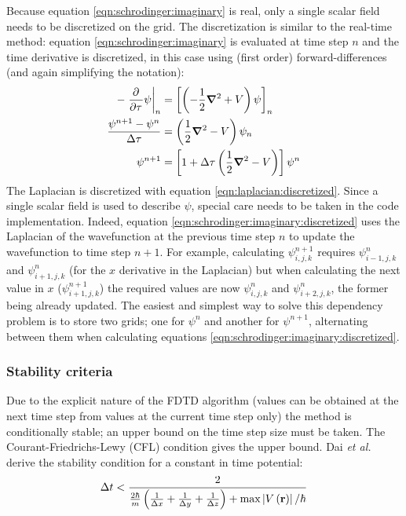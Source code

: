 Because equation \eqref{eqn:schrodinger:imaginary} is real, only a single scalar
field needs to be discretized on the grid. The discretization is similar to the
real-time method: equation \eqref{eqn:schrodinger:imaginary} is evaluated at
time step $n$ and the time derivative is discretized, in this case using (first
order) forward-differences (and again simplifying the notation):
\begin{align}
- \left. \frac{\partial^{{}} }{\partial {\tau}^{{}}} \psi \right|_{n}
    & = \left[  \left( -\frac{1}{2} \bm{\nabla}^2 + V \right) \psi  \right]_{n}
\\
\frac{\psi^{n+1} - \psi^{n}}{\Delta \tau}
    & = \left( \frac{1}{2} \bm{\nabla}^2 - V \right) \psi_{n}
\\
\psi^{n+1} & = \left[ 1 + \Delta \tau \left( \frac{1}{2} \bm{\nabla}^2 - V \right) \right] \psi^{n}
\label{eqn:schrodinger:imaginary:discretized}
\end{align}
The Laplacian is discretized with equation \eqref{eqn:laplacian:discretized}.
Since a single scalar field is used to describe $\psi$, special care needs to
be taken in the code implementation. Indeed, equation
\eqref{eqn:schrodinger:imaginary:discretized} uses the Laplacian of the
wavefunction at the previous time step $n$ to update the wavefunction to
time step $n+1$. For example, calculating $\psi^{n+1}_{i,j,k}$ requires
$\psi^{n}_{i-1,j,k}$ and $\psi^{n}_{i+1,j,k}$ (for the $x$ derivative in the
Laplacian) but when calculating the next value in $x$ ($\psi^{n+1}_{i+1,j,k}$)
the required values are now $\psi^{n}_{i,j,k}$ and $\psi^{n}_{i+2,j,k}$, the
former being already updated. The easiest and simplest way to solve this
dependency problem is to store two grids; one for $\psi^{n}$ and another for
$\psi^{n+1}$, alternating between them when calculating equations
\eqref{eqn:schrodinger:imaginary:discretized}.


\subsubsection{Stability criteria}

Due to the explicit nature of the FDTD algorithm (values can be obtained at the
next time step from values at the current time step only) the method is
conditionally stable; an upper bound on the time step size must be taken. The
Courant-Friedrichs-Lewy (CFL) condition gives the upper bound. Dai \textit{et
al.} derive\cite{Dai2005} the stability condition for a constant in time
potential:
\begin{align}
\Delta t < \frac{2}{
    \frac{2 \hbar}{m} \left( 
         \frac{1}{\Delta x}
        +\frac{1}{\Delta y}
        +\frac{1}{\Delta z}
         \right)
        + \textrm{max}\left| V\left( \textbf{r} \right) \right| / \hbar
    }
\end{align}



